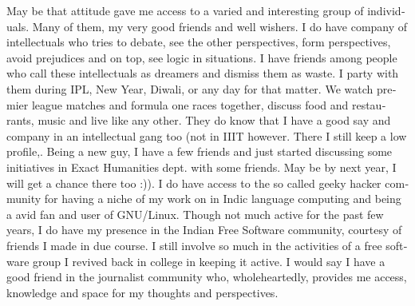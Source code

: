 \begin{english}
May be that attitude gave me access to a varied and interesting group of individuals. Many of them, 
my very good friends and well wishers. I do have company of intellectuals who tries to debate, see 
the other perspectives, form perspectives, avoid prejudices and on top, see logic in situations. I 
have friends among people who call these intellectuals as dreamers and dismiss them as waste. I party 
with them during IPL, New Year, Diwali, or any day for that matter. We watch premier league matches 
and formula one races together, discuss food and restaurants, music and live like any other. They do 
know that I have a good say and company in an intellectual gang too (not in IIIT however. There I still keep a low
profile,. Being a new guy, I have a few friends and just started discussing some initiatives in Exact
Humanities dept. with some friends. May be by next year, I will get a chance there too :)). I do 
have access to the so called geeky hacker community for having a niche of my work on in Indic 
language computing and being a avid fan and user of GNU/Linux. Though not much active for the past 
few years, I do have my presence in the Indian Free Software community, courtesy of friends I made in 
due course. I still involve so much in the activities of a free software group I revived back in 
college in keeping it active. I would say I have a good friend in the journalist community who, wholeheartedly, provides me access, knowledge and space for my thoughts and perspectives.  



\end{english}
